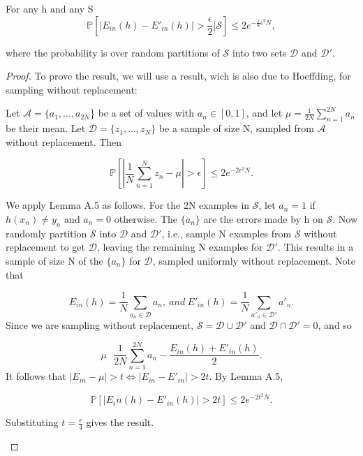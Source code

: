 \begin{lema}
  \label{lema:A4}
  For any h and any S
   \begin{displaymath}
       \mathbb{P} \left[| E_{in}(h) - E'_{in}(h) | > \frac{\epsilon}{2} \Big\vert \mathcal{S} \right] \leq 2e^{- \frac{1}{8} \epsilon^2 N},
   \end{displaymath}

   where the probability is over random partitions of $\mathcal{S}$ into two sets $\mathcal{D}$ and $\mathcal{D}'$.

   \begin{proof}
       To prove the result, we will use a result, wich is also due to Hoeffding, for sampling without replacement:
       \begin{lema} [(Hoeffding, 1963)]
         \label{lema:A5}
          Let $\mathcal{A} = \{a_1,..., a_{2N}$\} be a set of values with $a_n \in [0,1]$, and let $\mu = \frac{1}{2N} \sum_{n=1}^{2N} a_n$ be their mean. Let $\mathcal{D} = \{z_1,..., z_N\}$ be a sample of size N, sampled from $\mathcal{A}$ without replacement. Then

          \begin{displaymath}
             \mathbb{P} \left[ \left| \frac{1}{N} \sum_{n=1}^N z_n - \mu \right| > \epsilon \right] \leq 2e^{-2 \epsilon^2 N}.
          \end{displaymath}

          We apply Lemma A.5 as follows. For the 2N examples in $\mathcal{S}$, let $a_n = 1$ if $h(x_n) \neq y_n$ and $a_n = 0$ otherwise. The $\{a_n\}$ are the errors made by h on $\mathcal{S}$. Now randomly partition $\mathcal{S}$ into $\mathcal{D}$ and $\mathcal{D}'$, i.e., sample N examples from $\mathcal{S}$ without replacement to get $\mathcal{D}$, leaving the remaining N examples for $\mathcal{D}'$. This results in a sample of size N of the $\{a_n\}$ for $\mathcal{D}$, sampled uniformly without replacement. Note that

          \begin{displaymath}
              E_{in}(h) = \frac{1}{N} \sum_{a_n \in \mathcal{D}} a_n, \ and \ E'_{in}(h) = \frac{1}{N} \sum_{a'_n \in \mathcal{D}'} a'_n.
          \end{displaymath}
         Since we are sampling without replacement, $\mathcal{S} = \mathcal{D} \cup \mathcal{D}'$ and $\mathcal{D} \cap \mathcal{D}' = 0$, and so

         \begin{displaymath}
             \mu \ \ \ \frac{1}{2N} \sum_{n=1}^{2N} a_n - \frac{E_{in}(h) + E'_{in}(h)}{2}.
         \end{displaymath}
         It follows that $| E_{in} - \mu | > t \Leftrightarrow | E_{in} - E'_{in} | > 2t$. By Lemma A.5,

         \begin{displaymath}
             \mathbb{P} \left[| E_in(h) - E'_{in}(h) | > 2t \right] \leq 2e^{-2t^2 N}.
         \end{displaymath}

         Substituting $t = \frac{\epsilon}{4}$ gives the result.

       \end{lema}
   \end{proof}
\end{lema}
